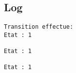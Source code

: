 \documentclass{article}
\begin{document}
\subsection{Log}
\begin{verbatim}
Transition effectue:
Etat : 1

Etat : 1

Etat : 1
\end{verbatim}
\end{document}

